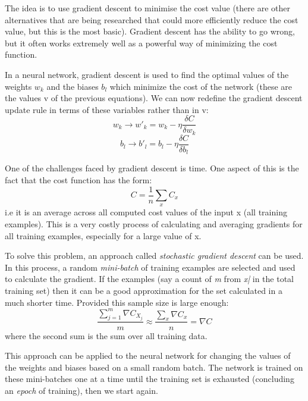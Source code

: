 \documentclass[a4paper,12pt]{article}
\begin{document}
The idea is to use gradient descent to minimise the cost value (there are other alternatives that are being researched that could more efficiently reduce the cost value, but this is the most basic). Gradient descent has the ability to go wrong, but it often works extremely well as a powerful way of minimizing the cost function.

In a neural network, gradient descent is used to find the optimal values of the weights $w_k$ and the biases $b_l$ which minimize the cost of the network (these are the values v of the previous equations). We can now redefine the gradient descent update rule in terms of these variables rather than in v: $$w_k \rightarrow w'_k=w_k-\eta \frac{\delta C}{\delta w_k}$$ $$b_l \rightarrow b'_l=b_l-\eta \frac{\delta C}{\delta b_l}$$

One of the challenges faced by gradient descent is time. One aspect of this is the fact that the cost function has the form: $$C=\frac{1}{n}\sum_xC_x$$ i.e it is an average across all computed cost values of the input x (all training examples). This is a very costly process of calculating and averaging gradients for all training examples, especially for a large value of x.

To solve this problem, an approach called \textit{stochastic gradient descent} can be used. In this process, a random \textit{mini-batch} of training examples are selected and used to calculate the gradient. If the examples (say a count of \textit{m} from \textit{x|} in the total training set) then it can be a good approximation for the set calculated in a much shorter time. Provided this sample size is large enough:$$\frac{\sum_{j=1}^m \nabla C_{X_j}}{m} \approx \frac{\sum_x \nabla C_x}{n}=\nabla C$$ where the second sum is the sum over all training data.

This approach can be applied to the neural network for changing the values of the weights and biases based on a small random batch. The network is trained on these mini-batches one at a time until the training set is exhausted (concluding an \textit{epoch} of training), then we start again.
\end{document}
